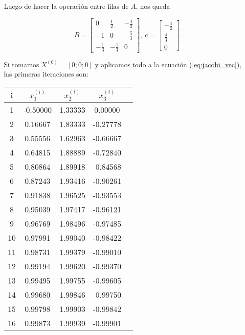\documentclass{article}
\begin{document}
Luego de hacer la operación entre filas de $A$, nos queda

\begin{equation*}
    B = 
    \begin{bmatrix}
        0 & \frac{1}{2} & -\frac{1}{2} \\
        -1 & 0 & -\frac{5}{3} \\
        -\frac{1}{3} & -\frac{1}{3} & 0
    \end{bmatrix},\ 
    c = 
    \begin{bmatrix}
        -\frac{1}{2} \\ \frac{4}{3} \\ 0
    \end{bmatrix}
\end{equation*}

Si tomamos $X^{(0)} = [0;0;0]$ y aplicamos todo a la ecuación 
(\ref{eq:jacobi_vec}), las primeras iteraciones son:

\begin{table}[h]
\centering
\begin{tabular}{ccccc}
    i & $x_1^{(i)}$ & $x_2^{(i)}$ & $x_3^{(i)}$ \\\hline
    1 & -0.50000    & 1.33333     &  0.00000    \\
    2 & 0.16667     & 1.83333     & -0.27778    \\
    3 & 0.55556     & 1.62963     & -0.66667    \\
    4 & 0.64815     & 1.88889     & -0.72840    \\
    5 & 0.80864     & 1.89918     & -0.84568    \\
    6 & 0.87243     & 1.93416     & -0.90261    \\
    7 & 0.91838     & 1.96525     & -0.93553    \\
    8 & 0.95039     & 1.97417     & -0.96121    \\
    9 & 0.96769     & 1.98496     & -0.97485    \\
   10 & 0.97991     & 1.99040     & -0.98422    \\
   11 & 0.98731     & 1.99379     & -0.99010    \\
   12 & 0.99194     & 1.99620     & -0.99370    \\
   13 & 0.99495     & 1.99755     & -0.99605    \\
   14 & 0.99680     & 1.99846     & -0.99750    \\
   15 & 0.99798     & 1.99903     & -0.99842    \\
   16 & 0.99873     & 1.99939     & -0.99901
\end{tabular}
\end{table}
\end{document}
